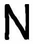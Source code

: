 \documentclass[russian,utf8,emptystyle]{eskdtext}
\begin{document}
\begin{figure}[!htb]
\includegraphics[width=\linewidth]{../data/learn/n/001}
\endminipage\hfill
{}

\end{figure}
\end{document}
